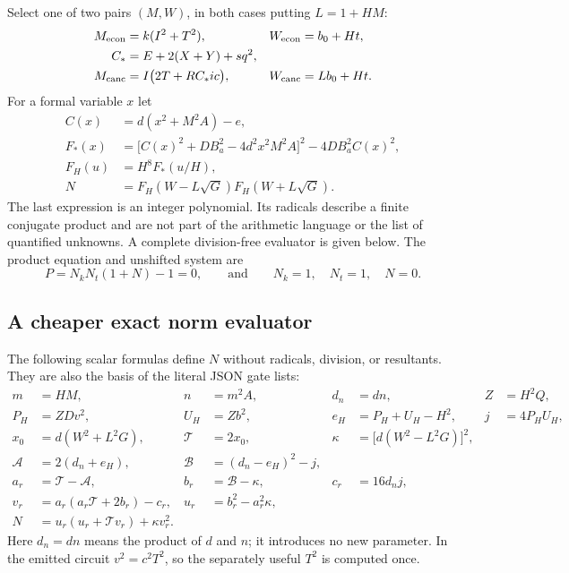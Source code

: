 Select one of two pairs $(M,W)$, in both cases putting $L=1+HM$:
\begin{align}
 M_{\rm econ}&=k(I^2+T^2),&
 W_{\rm econ}&=b_0+Ht, \label{eq:economical-new}\\
 C_*&=E+2(X+Y)+sq^2, \nonumber\\
 M_{\rm canc}&=I\bigl(2T+RC_*ic\bigr),&
 W_{\rm canc}&=Lb_0+Ht. \label{eq:cancellation-new}
\end{align}
For a formal variable $x$ let
\begin{align*}
 C(x)&=d(x^2+M^2A)-e,\\
 F_*(x)&=\bigl[C(x)^2+DB_a^2-4d^2x^2M^2A\bigr]^2
                    -4DB_a^2C(x)^2,\\
 F_H(u)&=H^8F_*(u/H),\\
 N&=F_H(W-L\sqrt G)F_H(W+L\sqrt G).
\end{align*}
The last expression is an integer polynomial.  Its radicals describe a
finite conjugate product and are not part of the arithmetic language or
the list of quantified unknowns.  A complete division-free evaluator is
given below.  The product equation and unshifted system are
\begin{equation}
 P=N_kN_t(1+N)-1=0,
 \qquad\text{and}\qquad N_k=1,\quad N_t=1,\quad N=0.
 \label{eq:two-positive-presentations}
\end{equation}

\subsection{A cheaper exact norm evaluator}

The following scalar formulas define $N$ without radicals, division, or
resultants.  They are also the basis of the literal JSON gate lists:
\begin{align*}
 m&=HM,&n&=m^2A,&d_n&=dn,&Z&=H^2Q,\\
 P_H&=ZDv^2,&U_H&=Zb^2,&e_H&=P_H+U_H-H^2,&j&=4P_HU_H,\\
 x_0&=d(W^2+L^2G),&\mathcal T&=2x_0,&
 \kappa&=\bigl[d(W^2-L^2G)\bigr]^2,\\
 \mathcal A&=2(d_n+e_H),&
 \mathcal B&=(d_n-e_H)^2-j,\\
 a_r&=\mathcal T-\mathcal A,&b_r&=\mathcal B-\kappa,&
 c_r&=16d_nj,\\
 v_r&=a_r(a_r\mathcal T+2b_r)-c_r,&
 u_r&=b_r^2-a_r^2\kappa,\\
 N&=u_r(u_r+\mathcal T v_r)+\kappa v_r^2.
\end{align*}
Here $d_n=dn$ means the product of $d$ and $n$; it introduces no new
parameter.  In the emitted circuit $v^2=c^2T^2$, so the separately useful
$T^2$ is computed once.

